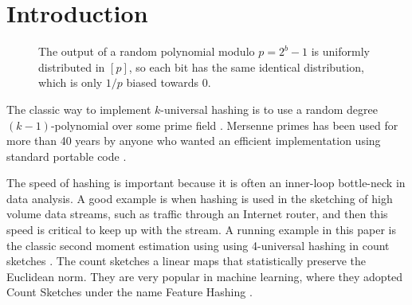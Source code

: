 \section{Introduction}

\begin{figure}
   \centering
   \caption{The output of a random polynomial modulo $p=2^b-1$ is uniformly distributed in $[p]$, so each bit has the same identical distribution, which is only $1/p$ biased towards 0.}
   \label{fig:bits}
\end{figure}

The classic way to implement $k$-universal hashing is to use a random
degree $(k-1)$-polynomial over some prime field
\cite{wegman81kwise}. Mersenne primes has been used for more than 40
years by anyone who
wanted an efficient implementation
using standard portable code \cite{carter77universal}.

The speed of hashing is important because it is often an inner-loop
bottle-neck in data analysis. A good example is when hashing is used
in the sketching of high volume data streams, such as traffic through
an Internet router, and then this speed is critical to keep up with
the stream. A running example in this paper is the classic second
moment estimation using using 4-universal hashing in count sketches
\cite{charikar04count-sketch}. The count sketches a linear maps that
statistically preserve the Euclidean norm. They are very popular in
machine learning, where they adopted Count Sketches under the name
Feature Hashing \cite{moody1989fast,weinberger2009feature}.

